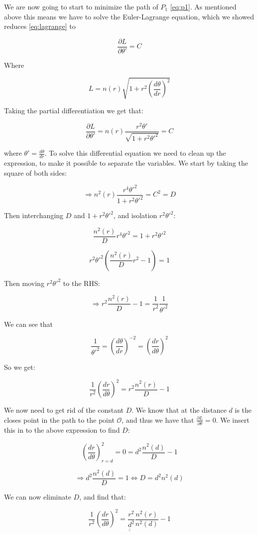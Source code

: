 \documentclass[a4paper,norsk, 10pt]{article}
\begin{document}
We are now going to start to minimize the path of $P_1$ \ref{eq:p1}. As mentioned above this means we have to solve the Euler-Lagrange equation, which we showed reduces \ref{eq:lagrange} to

$$
\frac{\partial L}{\partial \theta'} = C
$$

Where

$$
L = n(r)\sqrt{1 + r^2 \left(\frac{d\theta}{dr}\right)^2}
$$

Taking the partial differentiation we get that:

$$
\frac{\partial L}{\partial \theta'} = n(r) \frac{r^2\theta'}{\sqrt{1 + r^2\theta'^2}} = C
$$

where $\theta' = \frac{d\theta}{dr}$. To solve this differential equation we need to clean up the expression, to make it possible to separate the variables. We start by taking the square of both sides:

$$
\Rightarrow n^2(r)\frac{r^4 \theta'^2}{1+r^2\theta'^2} = C^2 = D
$$

Then interchanging $D$ and $1+r^2\theta'^2$, and isolation $r^2\theta'^2$:

$$
\frac{n^2(r)}{D}r^4\theta'^2 = 1 + r^2\theta'^2
$$

$$
r^2\theta'^2\left(\frac{n^2(r)}{D}r^2 - 1\right) = 1
$$

Then moving $r^2\theta'^2$ to the RHS:

$$
\Rightarrow r^2\frac{n^2(r)}{D} - 1 = \frac{1}{r^2}\frac{1}{\theta'^2}
$$

We can see that 

$$
\frac{1}{\theta'^2} = \left(\frac{d\theta}{dr}\right)^{-2} = \left(\frac{dr}{d\theta}\right)^2
$$

So we get:

$$
\frac{1}{r^2}\left(\frac{dr}{d\theta}\right)^2 = r^2\frac{n^2(r)}{D} -1
$$

We now need to get rid of the constant $D$. We know that at the distance $d$ is the closes point in the path to the point $\mathcal{O}$, and thus we have that $\frac{\partial L}{\partial \theta} = 0$. We insert this in to the above expression to find $D$:


$$
\left(\frac{dr}{d\theta}\right)^2_{r = d} = 0 = d^2\frac{n^2(d)}{D} -1
$$

$$
\Rightarrow d^2\frac{n^2(d)}{D} = 1 \Leftrightarrow D = d^2 n^2(d)
$$

We can now eliminate $D$, and find that:

\begin{equation}
\underline{\underline{\frac{1}{r^2}\left(\frac{dr}{d\theta}\right)^2 = \frac{r^2}{d^2}\frac{n^2(r)}{n^2(d)} -1}}
\label{eq:sepDiff}
\end{equation}
\end{document}

